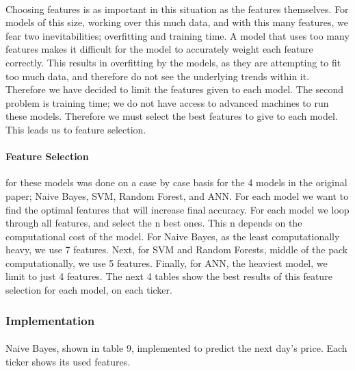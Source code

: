 \documentclass[11pt]{article}
\begin{document}
				\paragraph{} Choosing features is as important in this situation as the features themselves. For models of this size, working over this much data, and with this many features, we fear two inevitabilities; overfitting and training time. A model that uses too many features makes it difficult for the model to accurately weight each feature correctly. This results in overfitting by the models, as they are attempting to fit too much data, and therefore do not see the underlying trends within it. Therefore we have decided to limit the features given to each model. The second problem is training time; we do not have access to advanced machines to run these models. Therefore we must select the best features to give to each model. This leads us to feature selection.
				
				\paragraph{Feature Selection} for these models was done on a case by case basis for the 4 models in the original paper; Naive Bayes, SVM, Random Forest, and ANN. For each model we want to find the optimal features that will increase final accuracy. For each model we loop through all features, and select the n best ones. This n depends on the computational cost of the model. For Naive Bayes, as the least computationally heavy, we use 7 features. Next, for SVM and Random Forests, middle of the pack computationally, we use 5 features. Finally, for ANN, the heaviest model, we limit to just 4 features. The next 4 tables show the best results of this feature selection for each model, on each ticker.
				
			\subsubsection{Implementation}
				
				\paragraph{} Naive Bayes, shown in table 9, implemented to predict the next day's price. Each ticker shows its used features.
				
\end{document}
